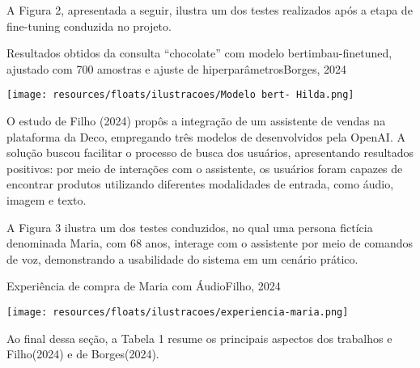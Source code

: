 A Figura 2, apresentada a seguir, ilustra um dos testes realizados após a etapa de fine-tuning conduzida no projeto.

\begin{figura}{ Resultados obtidos da consulta “chocolate” com modelo bertimbau-finetuned, ajustado com
700 amostras e ajuste de hiperparâmetros}{Borges, 2024}
    \begin{flushleft}
        \label{fig:keypoints}
        \texttt{[image: resources/floats/ilustracoes/Modelo bert- Hilda.png]}
    \end{flushleft}
\end{figura}
\FloatBarrier


O estudo de Filho (2024) propôs a integração de um assistente de vendas na plataforma da Deco, empregando três modelos de  
desenvolvidos pela OpenAI. A solução buscou facilitar o processo de busca dos usuários, apresentando resultados positivos: 
por meio de interações com o assistente, os usuários foram capazes de encontrar produtos utilizando diferentes 
modalidades de entrada, como áudio, imagem e texto.

A Figura 3 ilustra um dos testes conduzidos, no qual uma persona fictícia denominada Maria, com 68 anos, 
interage com o assistente por meio de comandos de voz, demonstrando a usabilidade do sistema em um cenário prático.

\begin{figura}{Experiência de compra de Maria com Áudio}{Filho, 2024}
    \begin{flushleft}
        \label{fig:esqueleto}
        \texttt{[image: resources/floats/ilustracoes/experiencia-maria.png]}
    \end{flushleft}
\end{figura}
\FloatBarrier

Ao final dessa seção, a Tabela 1 resume os principais aspectos dos trabalhos e Filho(2024) e de Borges(2024).

